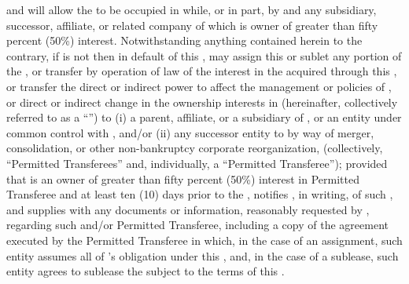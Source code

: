 \lessee and \lessor will allow the \premises to be occupied in while, or in part, by \lessee and any subsidiary, successor, affiliate, or related company of which \lessee is owner of greater than fifty percent (50\%) interest. Notwithstanding anything contained herein to the contrary, if \lessee is not then in default of this \lease, \lessee may assign this \lease or sublet any portion of the \premises, or transfer by operation of law of the interest in the \premises acquired through this \lease, or transfer the direct or indirect power to affect the management or policies of \lessee, or direct or indirect change in the ownership interests in \lessee (hereinafter, collectively referred to as a ``'') to (i) a parent, affiliate, or a subsidiary of \lessee, or an entity under common control with \lessee, and/or (ii) any successor entity to \lessee by way of merger, consolidation, or other non-bankruptcy corporate reorganization, (collectively, ``Permitted Transferees'' and, individually, a ``Permitted Transferee''); provided that \lessee is an owner of greater than fifty percent (50\%) interest in Permitted Transferee and at least ten (10) days prior to the \permittedTransfer, \lessee notifies \lessor, in writing, of such \permittedTransfer, and supplies \lessor with any documents or information, reasonably requested by \lessor, regarding such \permittedTransfer and/or Permitted Transferee, including a copy of the agreement executed by the Permitted Transferee in which, in the case of an assignment, such entity assumes all of \lessee's obligation under this \lease, and, in the case of a sublease, such entity agrees to sublease the \premises subject to the terms of this \lease.
